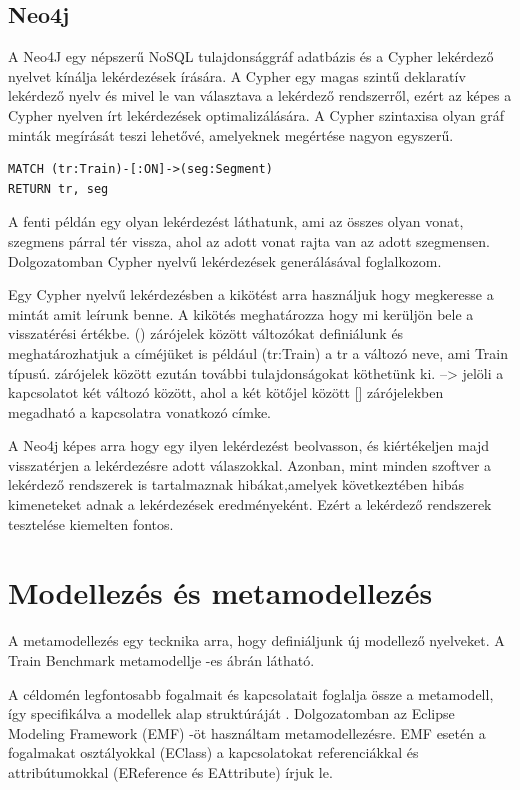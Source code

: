  
 
\subsection{Neo4j}

A Neo4J egy népszerű NoSQL tulajdonsággráf adatbázis és a Cypher lekérdező nyelvet kínálja lekérdezések írására. A Cypher egy magas szintű deklaratív lekérdező nyelv és mivel le van választava a lekérdező rendszerről, ezért az képes a Cypher nyelven írt lekérdezések optimalizálására. A Cypher szintaxisa olyan gráf minták megírását teszi lehetővé, amelyeknek megértése nagyon egyszerű.


\begin{lstlisting}[style=cyphersmall]
MATCH (tr:Train)-[:ON]->(seg:Segment)
RETURN tr, seg	
\end{lstlisting}   

A fenti példán egy olyan lekérdezést láthatunk,  ami az összes olyan vonat, szegmens párral tér vissza, ahol az adott vonat rajta van az adott szegmensen.  Dolgozatomban Cypher nyelvű lekérdezések generálásával foglalkozom.

Egy Cypher nyelvű lekérdezésben a  kikötést arra használjuk hogy megkeresse a mintát amit leírunk benne.
A  kikötés meghatározza hogy mi kerüljön bele a visszatérési értékbe. () zárójelek között változókat definiálunk és meghatározhatjuk a címéjüket is például (tr:Train) a tr a változó neve, ami Train típusú. {} zárójelek között ezután további tulajdonságokat köthetünk ki. --> jelöli a kapcsolatot két változó között, ahol a két kötőjel között [] zárójelekben megadható a kapcsolatra vonatkozó címke. 

A Neo4j képes arra hogy egy ilyen lekérdezést beolvasson, és kiértékeljen majd visszatérjen a lekérdezésre adott válaszokkal. Azonban, mint minden szoftver a lekérdező rendszerek is tartalmaznak hibákat,amelyek következtében hibás kimeneteket adnak a lekérdezések eredményeként. Ezért a lekérdező rendszerek tesztelése kiemelten fontos.

\section{Modellezés és metamodellezés}

A metamodellezés egy tecknika arra, hogy definiáljunk új modellező nyelveket. A Train Benchmark metamodellje  -es ábrán látható.

A céldomén legfontosabb fogalmait és kapcsolatait foglalja össze a metamodell, így specifikálva a modellek alap struktúráját \cite{semerath2017formal}. Dolgozatomban az Eclipse Modeling Framework (EMF) \cite{EMF} -öt használtam metamodellezésre. EMF esetén a fogalmakat osztályokkal (EClass) a kapcsolatokat referenciákkal és attribútumokkal (EReference és EAttribute) írjuk le.

